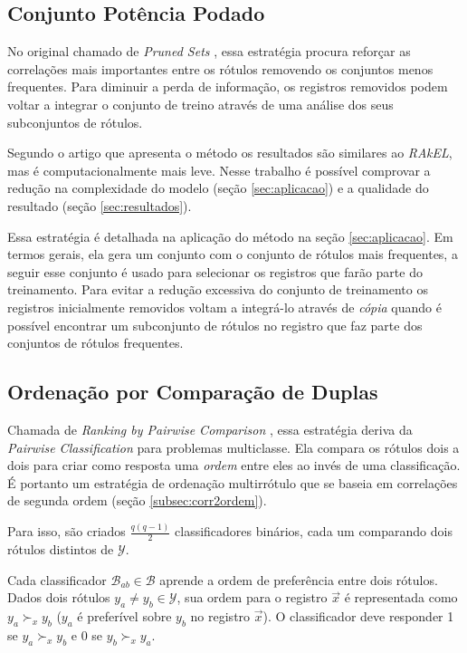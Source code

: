 \documentclass[runningheads,a4paper]{llncs}
\begin{document}
 
\subsection{Conjunto Potência Podado} \label{subsec:eps}

No original chamado de \textit{Pruned Sets} \cite{Read2008-bt}, essa estratégia procura reforçar as correlações mais importantes entre os rótulos removendo os conjuntos menos frequentes. Para diminuir a perda de informação, os registros removidos podem voltar a integrar o conjunto de treino através de uma análise dos seus subconjuntos de rótulos.

Segundo o artigo que apresenta o método os resultados são similares ao \textit{RAkEL}, mas é computacionalmente mais leve. Nesse trabalho é possível comprovar a redução na complexidade do modelo (seção \ref{sec:aplicacao}) e a qualidade do resultado (seção \ref{sec:resultados}).

Essa estratégia é detalhada na aplicação do método na seção \ref{sec:aplicacao}. Em termos gerais, ela gera um conjunto com o conjunto de rótulos mais frequentes, a seguir esse conjunto é usado para selecionar os registros que farão parte do treinamento. Para evitar a redução excessiva do conjunto de treinamento os registros inicialmente removidos voltam a integrá-lo através de \textit{cópia} quando é possível encontrar um subconjunto de rótulos no registro que faz parte dos conjuntos de rótulos frequentes.


\subsection{Ordenação por Comparação de Duplas} \label{subsec:comparacaoduplas}

Chamada de \textit{Ranking by Pairwise Comparison} \cite{Hullermeier2008-co}, essa estratégia deriva da \textit{Pairwise Classification} para problemas multiclasse. Ela compara os rótulos dois a dois para criar como resposta uma \textit{ordem} entre eles ao invés de uma classificação. É portanto um estratégia de ordenação multirrótulo que se baseia em correlações de segunda ordem (seção \ref{subsec:corr2ordem}).

Para isso, são criados $\frac{q(q - 1)}{2}$ classificadores binários, cada um comparando dois rótulos distintos de $\mathcal{Y}$.

Cada classificador $\mathcal{B}_{ab} \in \mathcal{B}$ aprende a ordem de preferência entre dois rótulos. Dados dois rótulos $y_a \neq y_b \in \mathcal{Y}$, sua ordem para o registro $\vec{x}$ é representada como $y_a \succ_x y_b$ ($y_a$ é preferível sobre $y_b$ no registro $\vec{x}$). O classificador deve responder 1 se $y_a \succ_x y_b$ e 0 se $y_b \succ_x y_a$.
\end{document}
